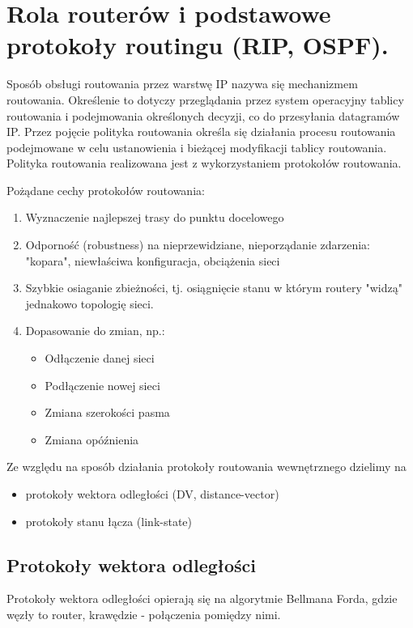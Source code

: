 \documentclass[12pt]{article}
\begin{document}
    \newpage

    \section{Rola routerów i podstawowe protokoły routingu (RIP, OSPF).}

    Sposób obsługi routowania przez warstwę IP nazywa się mechanizmem routowania.
    Określenie to dotyczy przeglądania przez system operacyjny tablicy routowania i podejmowania określonych decyzji, co do przesyłania datagramów IP.
    Przez pojęcie polityka routowania określa się działania procesu routowania podejmowane w
    celu ustanowienia i bieżącej modyfikacji tablicy routowania. Polityka routowania realizowana jest z wykorzystaniem protokołów routowania.

    Pożądane cechy protokołów routowania:
    \begin{enumerate}
        \item Wyznaczenie najlepszej trasy do punktu docelowego
        \item Odporność (robustness) na nieprzewidziane, nieporządanie zdarzenia:
        "kopara", niewłaściwa konfiguracja, obciążenia sieci
        \item Szybkie osiaganie zbieżności, tj. osiągnięcie stanu w którym
        routery "widzą" jednakowo topologię sieci.
        \item Dopasowanie do zmian, np.:
            \begin{itemize}
                \item Odłączenie danej sieci
                \item Podłączenie nowej sieci
                \item Zmiana szerokości pasma
                \item Zmiana opóźnienia
            \end{itemize}
    \end{enumerate}

    Ze względu na sposób działania protokoły routowania wewnętrznego dzielimy na
    \begin{itemize}
        \item protokoły wektora odległości (DV, distance-vector)
        \item protokoły stanu łącza (link-state)
    \end{itemize}

    \newpage

    \subsection{Protokoły wektora odległości}
        Protokoły wektora odległości opierają się na algorytmie Bellmana Forda, gdzie
        węzły to router, krawędzie - połączenia pomiędzy nimi.
\end{document}
